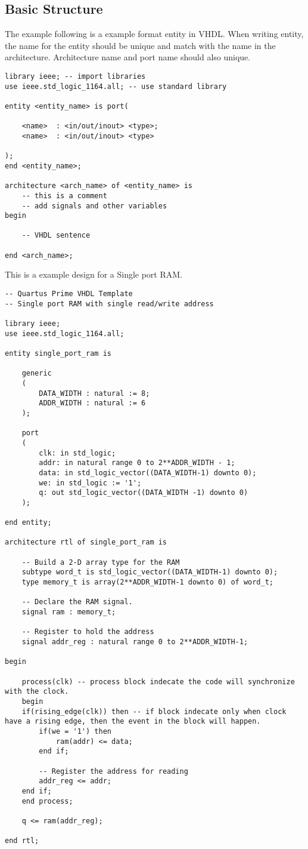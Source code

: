 \documentclass[12pt,article]{memoir}
\begin{document}
\subsection{Basic Structure}
The example following is a example format entity in VHDL. When writing entity, the name for the entity should be unique and match with the name in the architecture. Architecture name and port name should also unique.
\begin{lstlisting}
library ieee; -- import libraries
use ieee.std_logic_1164.all; -- use standard library

entity <entity_name> is port(

	<name>	: <in/out/inout> <type>;
	<name>	: <in/out/inout> <type>
		
);
end <entity_name>;
	
architecture <arch_name> of <entity_name> is
	-- this is a comment
	-- add signals and other variables
begin

	-- VHDL sentence

end <arch_name>;
\end{lstlisting}
This is a example design for a Single port RAM.
\begin{lstlisting}
-- Quartus Prime VHDL Template
-- Single port RAM with single read/write address 

library ieee;
use ieee.std_logic_1164.all;

entity single_port_ram is

	generic 
	(
		DATA_WIDTH : natural := 8;
		ADDR_WIDTH : natural := 6
	);

	port 
	(
		clk: in std_logic;
		addr: in natural range 0 to 2**ADDR_WIDTH - 1;
		data: in std_logic_vector((DATA_WIDTH-1) downto 0);
		we: in std_logic := '1';
		q: out std_logic_vector((DATA_WIDTH -1) downto 0)
	);

end entity;

architecture rtl of single_port_ram is

	-- Build a 2-D array type for the RAM
	subtype word_t is std_logic_vector((DATA_WIDTH-1) downto 0);
	type memory_t is array(2**ADDR_WIDTH-1 downto 0) of word_t;

	-- Declare the RAM signal.	
	signal ram : memory_t;

	-- Register to hold the address 
	signal addr_reg : natural range 0 to 2**ADDR_WIDTH-1;

begin

	process(clk) -- process block indecate the code will synchronize with the clock.
	begin
	if(rising_edge(clk)) then -- if block indecate only when clock have a rising edge, then the event in the block will happen.
		if(we = '1') then
			ram(addr) <= data;
		end if;

		-- Register the address for reading
		addr_reg <= addr;
	end if;
	end process;

	q <= ram(addr_reg);

end rtl;
\end{lstlisting}
\end{document}
